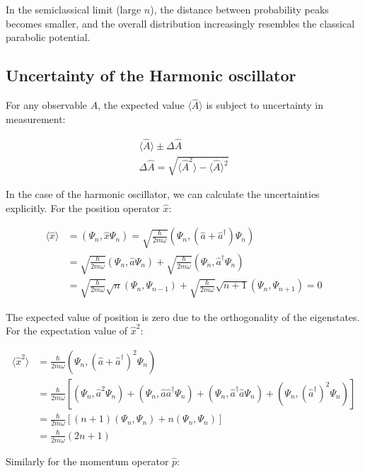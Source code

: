 \documentclass[italian]{HKNdocument}
\begin{document}
In the semiclassical limit (large $n$), the distance between probability peaks becomes smaller, and the overall distribution increasingly resembles the classical parabolic potential.

\subsection{Uncertainty of the Harmonic oscillator}

For any observable $\hat{A}$, the expected value $\langle\hat{A}\rangle$ is subject to uncertainty in measurement:

\begin{gather}
\langle\hat{A}\rangle \pm \Delta\hat{A} \label{eq:5.59} \\
\Delta\hat{A} = \sqrt{\langle\hat{A}^2\rangle - \langle\hat{A}\rangle^2} \label{eq:5.60}
\end{gather}


In the case of the harmonic oscillator, we can calculate the uncertainties explicitly. For the position operator $\hat{x}$:

\begin{align}
\langle\hat{x}\rangle &= (\Psi_n, \hat{x}\Psi_n) = \sqrt{\frac{\hbar}{2m\omega}}(\Psi_n, (\hat{a}+\hat{a}^\dagger)\Psi_n) \\
&= \sqrt{\frac{\hbar}{2m\omega}}(\Psi_n, \hat{a}\Psi_n) + \sqrt{\frac{\hbar}{2m\omega}}(\Psi_n, \hat{a}^\dagger\Psi_n) \\
&= \sqrt{\frac{\hbar}{2m\omega}}\sqrt{n}(\Psi_n, \Psi_{n-1}) + \sqrt{\frac{\hbar}{2m\omega}}\sqrt{n+1}(\Psi_n, \Psi_{n+1}) = 0
\end{align}

The expected value of position is zero due to the orthogonality of the eigenstates. For the expectation value of $\hat{x}^2$:

\begin{align}
\langle\hat{x}^2\rangle &= \frac{\hbar}{2m\omega}(\Psi_n, (\hat{a}+\hat{a}^\dagger)^2\Psi_n) \\
&= \frac{\hbar}{2m\omega}[(\Psi_n, \hat{a}^2\Psi_n) + (\Psi_n, \hat{a}\hat{a}^\dagger\Psi_n) + (\Psi_n, \hat{a}^\dagger\hat{a}\Psi_n) + (\Psi_n, (\hat{a}^\dagger)^2\Psi_n)] \\
&= \frac{\hbar}{2m\omega}[(n+1)(\Psi_n, \Psi_n) + n(\Psi_n, \Psi_n)] \\
&= \frac{\hbar}{2m\omega}(2n+1) \label{eq:5.61}
\end{align}

Similarly for the momentum operator $\hat{p}$:
\end{document}
